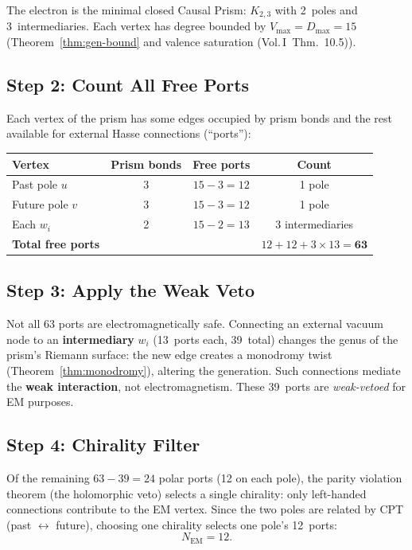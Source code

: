 \documentclass[11pt, a4paper, openany]{book}
\newcommand{\VolI}[1]{\textnormal{(Vol.\,I~#1)}}
\newcounter{thm}[chapter]
\begin{document}
The electron is the minimal closed Causal Prism: $K_{2,3}$ with 2~poles
and 3~intermediaries. Each vertex has degree bounded by
$V_{\max} = D_{\max} = 15$ (Theorem~\ref{thm:gen-bound} and
valence saturation \VolI{Thm.~10.5}).

\subsection{Step 2: Count All Free Ports}

Each vertex of the prism has some edges occupied by prism bonds and the
rest available for external Hasse connections (``ports''):

\begin{center}\small
\begin{tabular}{@{}lccc@{}}
\toprule
\textbf{Vertex} & \textbf{Prism bonds} & \textbf{Free ports} & \textbf{Count} \\
\midrule
Past pole $u$       & 3 & $15 - 3 = 12$ & 1 pole \\
Future pole $v$     & 3 & $15 - 3 = 12$ & 1 pole \\
Each $w_i$          & 2 & $15 - 2 = 13$ & 3 intermediaries \\
\midrule
\textbf{Total free ports} & & & $12 + 12 + 3 \times 13 = \mathbf{63}$ \\
\bottomrule
\end{tabular}
\end{center}

\subsection{Step 3: Apply the Weak Veto}

Not all 63 ports are electromagnetically safe. Connecting an external
vacuum node to an \textbf{intermediary} $w_i$ (13~ports each, 39~total)
changes the genus of the prism's Riemann surface: the new edge creates
a monodromy twist (Theorem~\ref{thm:monodromy}), altering the
generation. Such connections mediate the \textbf{weak interaction}, not
electromagnetism. These 39~ports are \emph{weak-vetoed} for EM purposes.

\subsection{Step 4: Chirality Filter}

Of the remaining $63 - 39 = 24$ polar ports (12 on each pole), the
parity violation theorem (the holomorphic veto) selects a single
chirality: only left-handed connections contribute to the EM vertex.
Since the two poles are related by CPT (past $\leftrightarrow$ future),
choosing one chirality selects one pole's 12~ports:
\[
  N_{\mathrm{EM}} = 12.
\]
\end{document}
